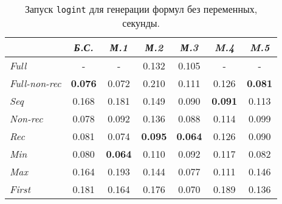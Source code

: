 \begin{table}[h!]
\center
\begin{tabular}{|l|c|c|c|c|c|c|}
\hline
   &{\it Б.С.}&{\it М.1}&{\it М.2}&{\it М.3}&{\it M.4}&{\it M.5}\\ \hline
{\it Full        } &    -        &    -         & 0.132       &  0.105       &    -        & -     \\ \hline
{\it Full-non-rec} & {\bf 0.076} & 0.072        & 0.210       &  0.111       & 0.126       & {\bf 0.081} \\ \hline
{\it Seq         } & 0.168       & 0.181        & 0.149       &  0.090       & {\bf 0.091} & 0.113 \\ \hline
{\it Non-rec     } & 0.078       & 0.092        & 0.136       &  0.088       & 0.114       & 0.099 \\ \hline
{\it Rec         } & 0.081       & 0.074        & {\bf 0.095} &  {\bf 0.064} & 0.126       & 0.090 \\ \hline
{\it Min         } & 0.080       & {\bf 0.064}  & 0.110       &  0.092       & 0.117       & 0.082 \\ \hline
{\it Max         } & 0.164       & 0.193        & 0.144       &  0.077       & 0.111       & 0.146 \\ \hline
{\it First       } & 0.181       & 0.164        & 0.176       &  0.070       & 0.189       & 0.136 \\ \hline
\end{tabular}
\caption{Запуск \lstinline{logint} для генерации формул без переменных, секунды.}
\label{fig:logintTest1}
\end{table}

